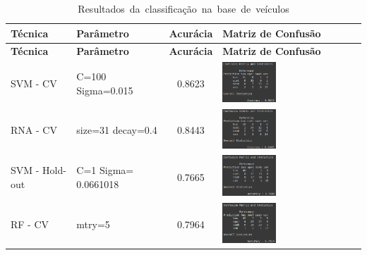 \begin{longtable}{|>{\centering\arraybackslash}p{2.5cm}|>{\centering\arraybackslash}m{2.5cm}|c|m{7cm}|}
\caption{\mbox{Resultados da classificação na base de veículos}} \\
\hline
\textbf{Técnica} & \textbf{Parâmetro} & \textbf{Acurácia} & \textbf{Matriz de Confusão} \\
\hline
\endfirsthead

\hline
\textbf{Técnica} & \textbf{Parâmetro} & \textbf{Acurácia} & \textbf{Matriz de Confusão} \\
\hline
\endhead

\hline
\colorbox[HTML]{CAF2C2}{SVM - CV} & C=100 Sigma=0.015 & \colorbox[HTML]{CAF2C2}{0.8623} & \includegraphics[width=0.4\textwidth]{apendices/fig/8_IAA008_1.png} \\
\hline
RNA - CV  & size=31 decay=0.4 & 0.8443 & \includegraphics[width=0.4\textwidth]{apendices/fig/8_IAA008_2.png} \\
\hline
SVM - Hold-out  & C=1 Sigma= 0.0661018 & 0.7665 & \includegraphics[width=0.4\textwidth]{apendices/fig/8_IAA008_3.png} \\
\hline
RF - CV   & mtry=5 & 0.7964 & \includegraphics[width=0.4\textwidth]{apendices/fig/8_IAA008_4.png} \\

\end{longtable}
